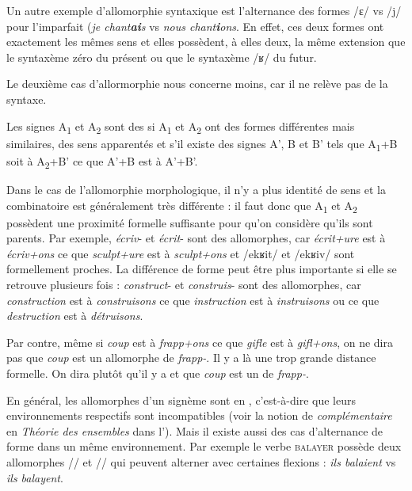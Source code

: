 Un autre exemple d’allomorphie syntaxique est l’alternance des formes /ɛ/ vs /j/ pour l’imparfait (\textit{je chant\textbf{ai}s} vs \textit{nous chant\textbf{i}ons}. En effet, ces deux formes ont exactement les mêmes sens et elles possèdent, à elles deux, la même extension que le syntaxème zéro du présent ou que le syntaxème /ʁ/ du futur.

Le deuxième cas d’allormorphie nous concerne moins, car il ne relève pas de la syntaxe.

{Les signes A\textsubscript{1} et A\textsubscript{2} sont des  si A\textsubscript{1} et A\textsubscript{2} ont des formes différentes mais similaires, des sens apparentés et s’il existe des signes A’, B et B’ tels que A\textsubscript{1}+B soit à A\textsubscript{2}+B’ ce que A’+B est à A’+B’.}

Dans le cas de l’allomorphie morphologique, il n’y a plus identité de sens et la combinatoire est généralement très différente : il faut donc que A\textsubscript{1} et A\textsubscript{2} possèdent une proximité formelle suffisante pour qu’on considère qu’ils sont parents. Par exemple, \textit{écriv}{}- et \textit{écrit}{}- sont des allomorphes, car \textit{écrit+ure} est à \textit{écriv+ons} ce que \textit{sculpt+ure} est à \textit{sculpt+ons} et /ekʁit/ et /ekʁiv/ sont formellement proches. La différence de forme peut être plus importante si elle se retrouve plusieurs fois : \textit{construct}{}- et \textit{construis}{}- sont des allomorphes, car \textit{construction} est à \textit{construisons} ce que \textit{instruction} est à \textit{instruisons} ou ce que \textit{destruction} est à \textit{détruisons}.

Par contre, même si \textit{coup} est à \textit{frapp+ons} ce que \textit{gifle} est à \textit{gifl+ons}, on ne dira pas que \textit{coup} est un allomorphe de \textit{frapp-}. Il y a là une trop grande distance formelle. On dira plutôt qu'il y a  et que \textit{coup} est un  de \textit{frapp-}.

En général, les allomorphes d’un signème sont en , c’est-à-dire que leurs environnements respectifs sont incompatibles (voir la notion de \textit{complémentaire} en \textit{Théorie des ensembles} dans l'). Mais il existe aussi des cas d’alternance de forme dans un même environnement. Par exemple le verbe \textsc{balayer} possède deux allomorphes // et // qui peuvent alterner avec certaines flexions : \textit{ils balaient} vs \textit{ils balayent}.

